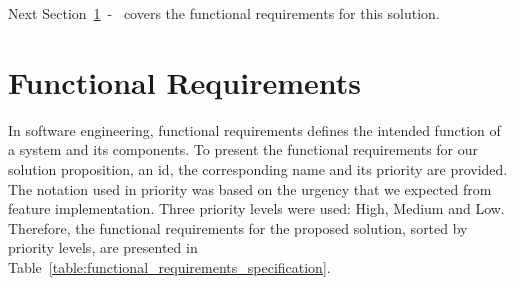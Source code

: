 Next Section~\ref{sec:functional_requirements}~-~ covers the functional requirements for this solution.

\section{Functional Requirements}
\label{sec:functional_requirements}

In software engineering, functional requirements defines the intended function of a system and its components. To present the functional requirements for our solution proposition, an id, the corresponding name and its priority are provided. The notation used in priority was based on the urgency that we expected from feature implementation. Three priority levels were used: High, Medium and Low. Therefore, the functional requirements for the proposed solution, sorted by priority levels, are presented in Table~\ref{table:functional_requirements_specification}.


